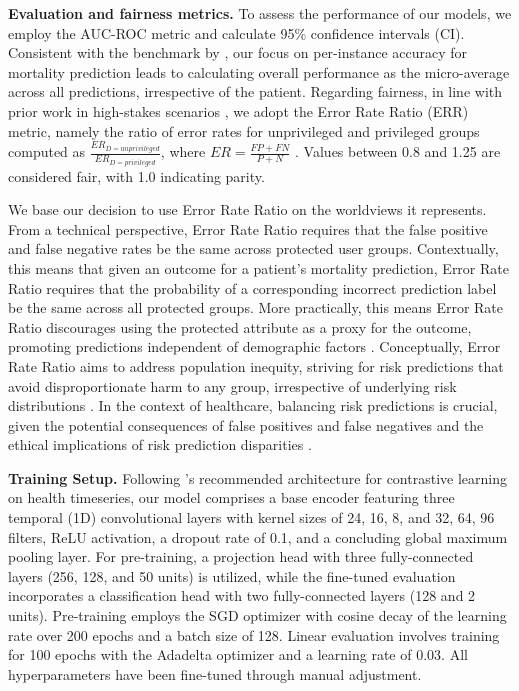 \documentclass[letterpaper]{article} %
\newcommand{\rev}[1]{\textcolor[rgb]{0.00,0.00,0.00}{#1}}
\begin{document}
\noindent\textbf{Evaluation and fairness metrics.} To assess the performance of our models, we employ the AUC-ROC metric and calculate 95\% confidence intervals (CI). Consistent with the benchmark by \citet{harutyunyan2019multitask}, our focus on per-instance accuracy for mortality prediction leads to calculating overall performance as the micro-average across all predictions, irrespective of the patient. Regarding fairness, in line with prior work in high-stakes scenarios \cite{purdy2023pursuit}, we adopt the Error Rate Ratio (ERR) metric, namely the ratio of error rates for unprivileged and privileged groups computed as $\frac{ER_{D=unprivileged}}{ER_{D=privileged}}$, where $ER=\frac{FP+FN}{P+N}$ \cite{bellamy2019ai}. Values between 0.8 and 1.25 are considered fair, with 1.0 indicating parity.

\rev{We base our decision to use Error Rate Ratio on the worldviews it represents. From a technical perspective, Error Rate Ratio requires that the false positive and false negative rates be the same across protected user groups. Contextually, this means that given an outcome for a patient's mortality prediction, Error Rate Ratio requires that the probability of a corresponding incorrect prediction label be the same across all protected groups. More practically, this means Error Rate Ratio discourages using the protected attribute as a proxy for the outcome, promoting predictions independent of demographic factors \cite{hardt2016equality}. Conceptually, Error Rate Ratio aims to address population inequity, striving for risk predictions that avoid disproportionate harm to any group, irrespective of underlying risk distributions \cite{green2020false}.}
In the context of healthcare, \rev{balancing risk predictions is crucial}, given the potential consequences of false positives and false negatives and the ethical implications of \rev{risk} prediction disparities \cite{burt2017burden}. 

\smallskip
\noindent\textbf{Training Setup.}
Following \citet{tang2020exploring}'s recommended architecture for contrastive learning on health timeseries, our model comprises a base encoder featuring three temporal (1D) convolutional layers with kernel sizes of 24, 16, 8, and 32, 64, 96 filters, ReLU activation, a dropout rate of 0.1, and a concluding global maximum pooling layer. For pre-training, a projection head with three fully-connected layers (256, 128, and 50 units) is utilized, while the fine-tuned evaluation incorporates a classification head with two fully-connected layers (128 and 2 units). Pre-training employs the SGD optimizer with cosine decay of the learning rate over 200 epochs and a batch size of 128. Linear evaluation involves training for 100 epochs with the Adadelta optimizer and a learning rate of 0.03. 
All hyperparameters have been fine-tuned through manual adjustment.
\end{document}
